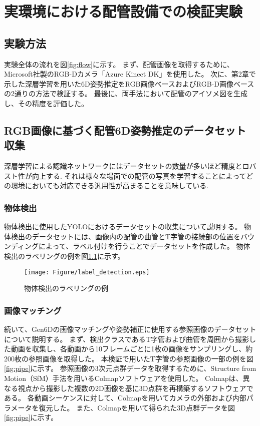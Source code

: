 ﻿\chapter{実環境における配管設備での検証実験}

\section{実験方法}
実験全体の流れを図\ref{fig:flow}に示す。
まず、配管画像を取得するために、Microsoft社製のRGB-Dカメラ「Azure Kinect DK」を使用した。
次に、第2章で示した深層学習を用いた6D姿勢推定をRGB画像ベースおよびRGB-D画像ベースの2通りの方法で検証する。
最後に、両手法において配管のアイソメ図を生成し、その精度を評価した。

\section{RGB画像に基づく配管6D姿勢推定のデータセット収集}
深層学習による認識ネットワークにはデータセットの数量が多いほど精度とロバスト性が向上する.
それは様々な場面での配管の写真を学習することによってどの環境においても対応できる汎用性が高まることを意味している.

\subsection{物体検出}
物体検出に使用したYOLOにおけるデータセットの収集について説明する。
物体検出のデータセットには、画像内の配管の曲管とT字管の接続部の位置をバウンディングによって、ラベル付けを行うことでデータセットを作成した。
物体検出のラベリングの例を図\ref{fig:f2}に示す。
\begin{figure}[htbt]
	\centering
	 \texttt{[image: Figure/label\_detection.eps]}
	 \caption{物体検出のラベリングの例}
	 \label{fig:f2}
\end{figure}

\subsection{画像マッチング}
続いて、Gen6Dの画像マッチングや姿勢補正に使用する参照画像のデータセットについて説明する。
まず、検出クラスであるT字管および曲管を周囲から撮影した動画を収集し、各動画から10フレームごとに1枚の画像をサンプリングし、約200枚の参照画像を取得した。
本検証で用いたT字管の参照画像の一部の例を図\ref{fig:pipe}に示す。
参照画像の3次元点群データを取得するために、Structure from Motion（SfM）手法を用いるColmapソフトウェアを使用した。
Colmapは、異なる視点から撮影した複数の2D画像を基に3D点群を再構築するソフトウェアである。
各動画シーケンスに対して、Colmapを用いてカメラの外部および内部パラメータを復元した。
また、Colmapを用いて得られた3D点群データを図\ref{fig:pipe}に示す。


